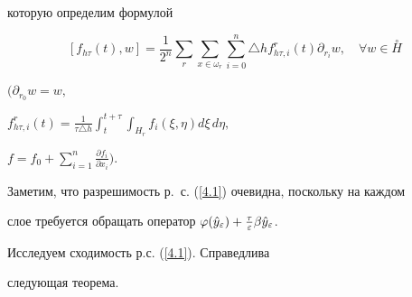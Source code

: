 которую определим формулой


$$


 [ f_{h\tau}(t) , w] = \frac{1}{2^n}


 \sum_{r}\sum^{}_{x \in \omega_{r}} \sum^{n}_{i=0}


 \triangle h


  f^{r}_{h \tau, i}(t) \partial_{r_{i}} w, \quad \forall w \in


  \overset \circ H


$$


$(\partial_{r_{0}} w = w,$


$f^{r}_{h \tau, i}(t) = \frac{1}{\tau \triangle h}


\int^{t+\tau}_{t} \int^{}_{H_{r}} f_{i}(\xi,\eta) d\xi\, d\eta,$


$f = f_0 + \sum^{n}_{i=1} \frac{\partial f_{i}}{\partial x_i}).$





Заметим, что разрешимость р.~с. (\ref{4.1}) очевидна, поскольку на каждом


слое требуется обращать оператор $\varphi(\Hat{y}_\varepsilon) +


\frac{\tau}{\varepsilon} \beta \Hat{y}_\varepsilon$.





Исследуем сходимость р.с. (\ref{4.1}). Справедлива


следующая теорема.


\par \




